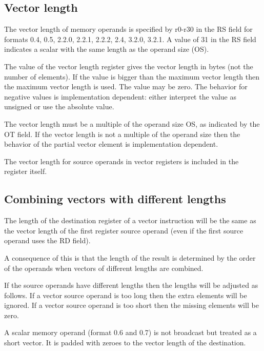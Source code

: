 \documentclass[forwardcom.tex]{subfiles}
\begin{document}
\subsection{Vector length}
The vector length of memory operands is specified by r0-r30 in the RS field for formats 0.4, 0.5, 2.2.0, 2.2.1, 2.2.2, 2.4, 3.2.0, 3.2.1. A value of 31 in the RS field indicates a scalar with the same length as the operand size (OS).
\vspace{2mm}

The value of the vector length register gives the vector length in bytes (not the number of elements). If the value is bigger than the maximum vector length then the maximum vector length is used. The value may be zero. The behavior for negative values is implementation dependent: either interpret the value as unsigned or use the absolute value.
\vspace{2mm}

The vector length must be a multiple of the operand size OS, as indicated by the OT field. If the vector length is not a multiple of the operand size then the behavior of the partial vector element is implementation dependent.
\vspace{2mm}

The vector length for source operands in vector registers is included in the register itself.

\subsection{Combining vectors with different lengths}
The length of the destination register of a vector instruction will be the same as the vector length of the first register source operand (even if the first source operand uses the RD field).
\vspace{2mm}

A consequence of this is that the length of the result is determined by the order of the operands when vectors of different lengths are combined.
\vspace{2mm}

If the source operands have different lengths then the lengths will be adjusted as follows. If a vector source operand is too long then the extra elements will be ignored. If a vector source operand is too short then the missing elements will be zero.
\vspace{2mm}

A scalar memory operand (format 0.6 and 0.7) is not broadcast but treated as a short vector. It is padded with zeroes to the vector length of the destination.
\vspace{2mm}
\end{document}
